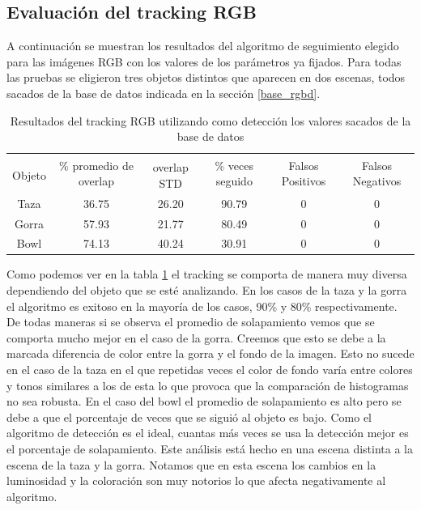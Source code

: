 \subsection{Evaluación del tracking RGB}
A continuación se muestran los resultados del algoritmo de seguimiento elegido para las imágenes RGB con los valores de los parámetros ya fijados. Para todas las pruebas se eligieron tres objetos distintos que aparecen en dos escenas, todos sacados de la base de datos indicada en la sección \ref{base_rgbd}.

\begin{table}[h]
    \begin{tabular}{|c|c|c|c|c|c|}
    \hline
    & \multirow{2}{2.4cm}{\% promedio de overlap} & & \multirow{2}{2cm}{\% veces seguido} & \multirow{2}{1.6cm}{Falsos Positivos} & \multirow{2}{1.6cm}{Falsos Negativos}\\
	Objeto & & overlap STD & & &\\
    \hline
    Taza   & 36.75      & 26.20       & 90.79             & 0                & 0\\
    \hline
    Gorra  & 57.93      & 21.77       & 80.49             & 0                & 0\\
    \hline
    Bowl   & 74.13      & 40.24       & 30.91             & 0                & 0\\
    \hline
    \end{tabular}
\caption{Resultados del tracking RGB utilizando como detección los valores sacados de la base de datos}
\label{tabla_rgb}
\end{table}

Como podemos ver en la tabla \ref{tabla_rgb} el tracking se comporta de manera muy diversa dependiendo del objeto que se esté analizando. En los casos de la taza y la gorra el algoritmo es exitoso en la mayoría de los casos, 90\% y 80\% respectivamente. De todas maneras si se observa el promedio de solapamiento vemos que se comporta mucho mejor en el caso de la gorra. Creemos que esto se debe a la marcada diferencia de color entre la gorra y el fondo de la imagen. Esto no sucede en el caso de la taza en el que repetidas veces el color de fondo varía entre colores y tonos similares a los de esta lo que provoca que la comparación de histogramas no sea robusta. En el caso del bowl el promedio de solapamiento es alto pero se debe a que el porcentaje de veces que se siguió al objeto es bajo. Como el algoritmo de detección es el ideal, cuantas más veces se usa la detección mejor es el porcentaje de solapamiento. Este análisis está hecho en una escena distinta a la escena de la taza y la gorra. Notamos que en esta escena los cambios en la luminosidad y la coloración son muy notorios lo que afecta negativamente al algoritmo.


